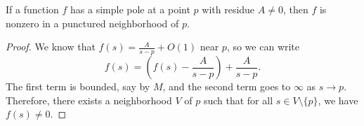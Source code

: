 \begin{theorem}[nonZeroOfBddAbove]
\label{nonZeroOfBddAbove}
\leanok
If a function $f$ has a simple pole at a point $p$ with residue $A \neq 0$, then
  $f$ is nonzero in a punctured neighborhood of $p$.
\end{theorem}
\begin{proof}
\leanok
We know that $f(s) = \frac{A}{s-p} + O(1)$ near $p$, so we can write
  $$f(s) = \left(f(s) - \frac{A}{s-p}\right) + \frac{A}{s-p}.$$
  The first term is bounded, say by $M$, and the second term goes to $\infty$ as $s \to p$.
  Therefore, there exists a neighborhood $V$ of $p$ such that for all $s \in V \setminus \{p\}$,
  we have $f(s) \neq 0$.
\end{proof}
